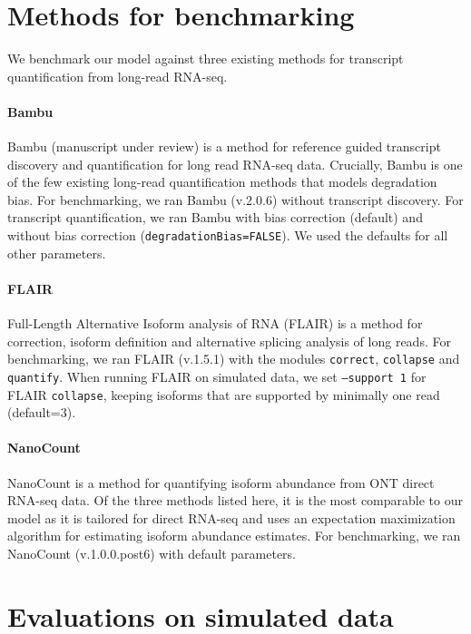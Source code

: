 \section{Methods for benchmarking}

We benchmark our model against three existing methods for transcript quantification from long-read RNA-seq. 

\paragraph{Bambu} Bambu (manuscript under review) \cite{Bambu2022} is a method for reference guided transcript discovery and quantification for long read RNA-seq data. Crucially, Bambu is one of the few existing long-read quantification methods that models degradation bias. For benchmarking, we ran Bambu (v.2.0.6) without transcript discovery. For transcript quantification, we ran Bambu with bias correction (default) and without bias correction (\texttt{degradationBias=FALSE}). We used the defaults for all other parameters.

\paragraph{FLAIR} Full-Length Alternative Isoform analysis of RNA (FLAIR) \cite{Tang2020} is a method for correction, isoform definition and alternative splicing analysis of long reads. For benchmarking, we ran FLAIR (v.1.5.1) with the modules \texttt{correct}, \texttt{collapse} and \texttt{quantify}. When running FLAIR on simulated data, we set \texttt{--support 1} for FLAIR \texttt{collapse}, keeping isoforms that are supported by minimally one read (default=3).  

\paragraph{NanoCount} NanoCount \cite{Gleeson2021} is a method for quantifying isoform abundance from ONT direct RNA-seq data. Of the three methods listed here, it is the most comparable to our model as it is tailored for direct RNA-seq and uses an expectation maximization algorithm for estimating isoform abundance estimates. For benchmarking, we ran NanoCount (v.1.0.0.post6) with default parameters.

\section{Evaluations on simulated data}\label{sec:eval-sim}

